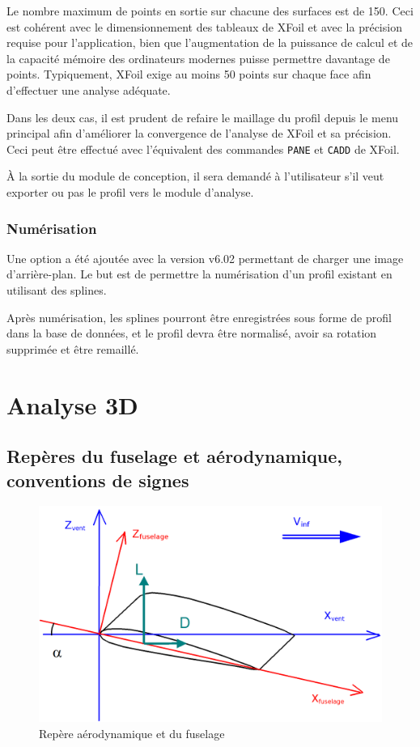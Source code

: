 \documentclass[a4paper,twoside,12pt,dvips]{article}
\begin{document}
Le nombre maximum de points en sortie sur chacune des surfaces est de 150.
Ceci est cohérent avec le dimensionnement des tableaux de XFoil et avec la
précision requise pour l’application, bien que l’augmentation de la puissance
de calcul et de la capacité mémoire des ordinateurs modernes puisse
permettre davantage de points. Typiquement, XFoil exige au moins 50 points
sur chaque face afin d’effectuer une analyse adéquate.

Dans les deux cas, il est prudent de refaire le maillage du profil depuis le menu principal afin d’améliorer la convergence de l’analyse de XFoil et sa précision. Ceci peut être effectué avec l’équivalent des commandes \texttt{PANE} et \texttt{CADD} de XFoil.

À la sortie du module de conception, il sera demandé à l’utilisateur s’il
veut exporter ou pas le profil vers le module d’analyse. 

\subsubsection{Numérisation}
Une option a été ajoutée avec la version v6.02 permettant de charger une
image d’arrière-plan. Le but est de permettre la numérisation d’un profil
existant en utilisant des splines.

Après numérisation, les splines pourront être enregistrées sous forme de
profil dans la base de données, et le profil devra être normalisé, avoir
sa rotation supprimée et être remaillé.

\section{Analyse 3D}

\label{section : analyse 3D}

\subsection{Repères du fuselage et aérodynamique, conventions de signes}

\begin{figure}[htbp]
	\centering
	\includegraphics[width=0.8\linewidth]{img-05-fr}
	\caption{Repère aérodynamique et du fuselage}
	\label{img:repères_aérodynamique_fuselage}
\end{figure}
\end{document}
